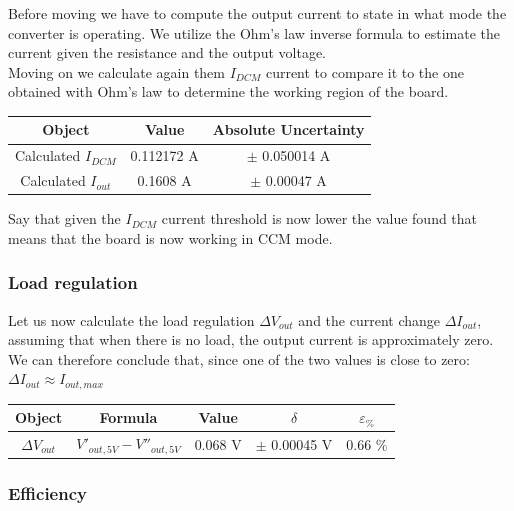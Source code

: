 \documentclass[../main.tex]{subfiles}
\begin{document}
Before moving we have to compute the output current to state in what mode the converter is operating. We utilize the Ohm's law inverse formula to estimate the current given the resistance and the output voltage.\\

Moving on we calculate again them $I_{DCM}$ current to compare it to the one obtained with Ohm's law to determine the working region of the board.

\begin{center}
\begin{tabular}{c c c}
\textbf{Object} & \textbf{Value} & \textbf{Absolute Uncertainty} \\

\hline
Calculated $I_{DCM}$ & 0.112172 A & $\pm$ 0.050014 A \\ 
\hline
Calculated $I_{out}$ & 0.1608 A & $\pm$ 0.00047 A \\ 

\end{tabular}
\end{center}


Say that given the $I_{DCM}$ current threshold is now lower the value found that means that the board is now working in CCM mode.

\subsubsection*{Load regulation}

Let us now calculate the load regulation $\Delta V_{out}$ and the current change $\Delta I_{out}$, assuming that when there is no load, the output current is approximately zero. We can therefore conclude that, since one of the two values is close to zero: $\Delta I_{out} \approx I_{out,max}$

\begin{center}
\begin{tabular}{c c c c c}
\textbf{Object} & \textbf{Formula} & \textbf{Value} & $\delta$ & $\varepsilon_{\%}$  \\
\hline
$\Delta V_{out}$ & $ V'_{out,5V} - V''_{out,5V} $ & 0.068 V & $\pm$ 0.00045 V & 0.66 \%  \\ 
\end{tabular}
\end{center}

\subsubsection*{Efficiency}
\end{document}
